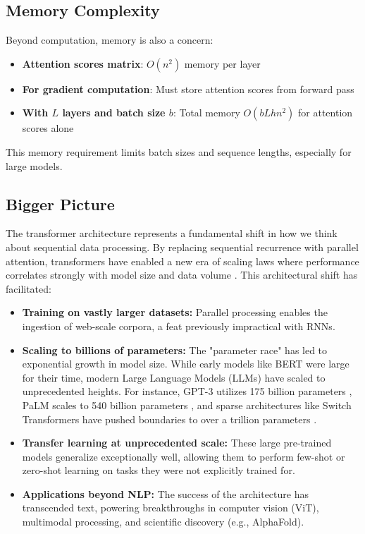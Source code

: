 \subsection{Memory Complexity}

Beyond computation, memory is also a concern:
\begin{itemize}
  \item \textbf{Attention scores matrix}: $O(n^2)$ memory per layer
  \item \textbf{For gradient computation}: Must store attention scores from forward pass
  \item \textbf{With $L$ layers and batch size $b$}: Total memory $O(bLhn^2)$ for attention scores alone
\end{itemize}

This memory requirement limits batch sizes and sequence lengths, especially for large models.


\subsection{Bigger Picture}

The transformer architecture represents a fundamental shift in how we think about sequential data processing. By replacing sequential recurrence with parallel attention, transformers have enabled a new era of scaling laws where performance correlates strongly with model size and data volume \cite{kaplan2020scaling}. This architectural shift has facilitated:

\begin{itemize}
    \item \textbf{Training on vastly larger datasets:} Parallel processing enables the ingestion of web-scale corpora, a feat previously impractical with RNNs.
    \item \textbf{Scaling to billions of parameters:} The "parameter race" has led to exponential growth in model size. While early models like BERT were large for their time, modern Large Language Models (LLMs) have scaled to unprecedented heights. For instance, GPT-3 utilizes 175 billion parameters \cite{brown2020language}, PaLM scales to 540 billion parameters \cite{chowdhery2022palm}, and sparse architectures like Switch Transformers have pushed boundaries to over a trillion parameters \cite{fedus2022switch}.
    \item \textbf{Transfer learning at unprecedented scale:} These large pre-trained models generalize exceptionally well, allowing them to perform few-shot or zero-shot learning on tasks they were not explicitly trained for.
    \item \textbf{Applications beyond NLP:} The success of the architecture has transcended text, powering breakthroughs in computer vision (ViT), multimodal processing, and scientific discovery (e.g., AlphaFold).
\end{itemize}

